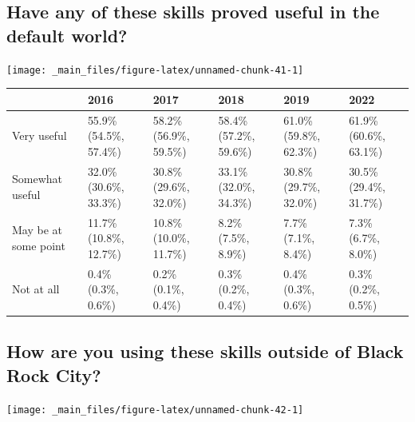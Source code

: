 \documentclass[
]{book}
\begin{document}
\hypertarget{have-any-of-these-skills-proved-useful-in-the-default-world}{%
\subsection{Have any of these skills proved useful in the default world?}\label{have-any-of-these-skills-proved-useful-in-the-default-world}}

\texttt{[image: \_main\_files/figure-latex/unnamed-chunk-41-1]}

\begin{table}
\centering
\begin{tabular}[t]{>{}l|>{}l|>{}l|>{}l|>{}l|>{}l}
\hline
  & 2016 & 2017 & 2018 & 2019 & 2022\\
\hline
Very useful & 55.9\% (54.5\%, 57.4\%) & 58.2\% (56.9\%, 59.5\%) & 58.4\% (57.2\%, 59.6\%) & 61.0\% (59.8\%, 62.3\%) & 61.9\% (60.6\%, 63.1\%)\\
\hline
Somewhat useful & 32.0\% (30.6\%, 33.3\%) & 30.8\% (29.6\%, 32.0\%) & 33.1\% (32.0\%, 34.3\%) & 30.8\% (29.7\%, 32.0\%) & 30.5\% (29.4\%, 31.7\%)\\
\hline
May be at some point & 11.7\% (10.8\%, 12.7\%) & 10.8\% (10.0\%, 11.7\%) & 8.2\% (7.5\%, 8.9\%) & 7.7\% (7.1\%, 8.4\%) & 7.3\% (6.7\%, 8.0\%)\\
\hline
Not at all & 0.4\% (0.3\%, 0.6\%) & 0.2\% (0.1\%, 0.4\%) & 0.3\% (0.2\%, 0.4\%) & 0.4\% (0.3\%, 0.6\%) & 0.3\% (0.2\%, 0.5\%)\\
\hline
\end{tabular}
\end{table}

\hypertarget{how-are-you-using-these-skills-outside-of-black-rock-city}{%
\subsection{How are you using these skills outside of Black Rock City?}\label{how-are-you-using-these-skills-outside-of-black-rock-city}}

\texttt{[image: \_main\_files/figure-latex/unnamed-chunk-42-1]}
\end{document}
